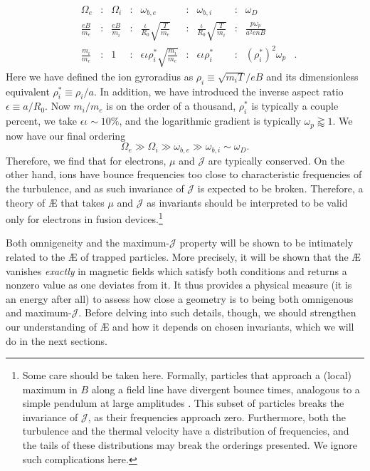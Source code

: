 \begin{equation*}
    \begin{aligned}
        &\Omega_e & \colon & \Omega_i & \colon & \omega_{b,e} & \colon & \omega_{b,i} & \colon & \omega_{D} & \\
        & \frac{eB}{m_e} & \colon & \frac{eB}{m_i} & \colon & \frac{\iota}{R_0}\sqrt{\frac{T}{m_e}} & \colon & \frac{\iota}{R_0} \sqrt{\frac{T}{m_i}} & \colon & \frac{p \omega_p}{a^2 enB}  & \\
        & \frac{m_i}{m_e} & \colon & 1 & \colon & \epsilon \iota \rho_i^* \sqrt{\frac{m_i}{m_e}} & \colon & \epsilon \iota \rho_i^* & \colon &  (\rho_i^*)^2 \omega_p &.
    \end{aligned}
\end{equation*}
Here we have defined the ion gyroradius as $\rho_i \equiv \sqrt{m_i T}/eB$ and its dimensionless equivalent $\rho_i^*\equiv \rho_i/a$. In addition, we have introduced the inverse aspect ratio $\epsilon \equiv a/R_0$. Now $m_i/m_e$ is on the order of a thousand, $\rho_i^*$ is typically a couple percent, we take $\epsilon \iota \sim 10 \%$, and the logarithmic gradient is typically $\omega_p \gtrapprox 1$. We now have our final ordering
\begin{equation}
    \Omega_e  \gg \Omega_i \gg \omega_{b,e} \gg \omega_{b,i} \sim \omega_{D}.
\end{equation}
Therefore, we find that for electrons, $\mu$ and $\mathcal{J}$ are typically conserved. On the other hand, ions have bounce frequencies too close to characteristic frequencies of the turbulence, and as such invariance of $\mathcal{J}$ is expected to be broken. Therefore, a theory of \AE{} that takes $\mu$ and $\mathcal{J}$ as invariants should be interpreted to be valid only for electrons in fusion devices.\footnote{Some care should be taken here. Formally, particles that approach a (local) maximum in $B$ along a field line have divergent bounce times, analogous to a simple pendulum at large amplitudes \cite{lewowski2002period}. This subset of particles breaks the invariance of $\mathcal{J}$, as their frequencies approach zero. Furthermore, both the turbulence and the thermal velocity have a distribution of frequencies, and the tails of these distributions may break the orderings presented. We ignore such complications here.} \par
Both omnigeneity and the maximum-$\mathcal{J}$ property will be shown to be intimately related to the \AE{} of trapped particles. More precisely, it will be shown that the \AE{} vanishes \textit{exactly} in magnetic fields which satisfy both conditions and returns a nonzero value as one deviates from it. It thus provides a physical measure (it is an energy after all) to assess how close a geometry is to being both omnigenous and maximum-$\mathcal{J}$. Before delving into such details, though, we should strengthen our understanding of \AE{} and how it depends on chosen invariants, which we will do in the next sections.



